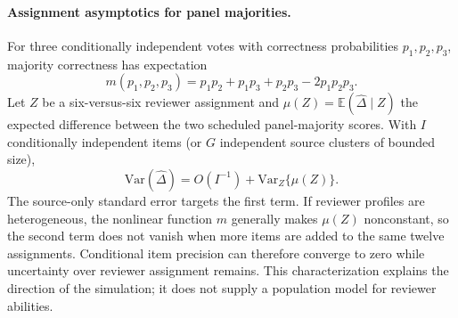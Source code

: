 \paragraph{Assignment asymptotics for panel majorities.}
For three conditionally independent votes with correctness probabilities
\(p_1,p_2,p_3\), majority correctness has expectation
\[
m(p_1,p_2,p_3)
=p_1p_2+p_1p_3+p_2p_3-2p_1p_2p_3.
\]
Let \(Z\) be a six-versus-six reviewer assignment and
\(\mu(Z)=\mathbb E(\widehat\Delta\mid Z)\) the expected difference between
the two scheduled panel-majority scores. With \(I\) conditionally independent
items (or \(G\) independent source clusters of bounded size),
\[
\mathrm{Var}(\widehat\Delta)
=O(I^{-1})+\mathrm{Var}_{Z}\{\mu(Z)\}.
\]
The source-only standard error targets the first term. If reviewer profiles
are heterogeneous, the nonlinear function \(m\) generally makes
\(\mu(Z)\) nonconstant, so the second term does not vanish when more items are
added to the same twelve assignments. Conditional item precision can
therefore converge to zero while uncertainty over reviewer assignment remains.
This characterization explains the direction of the simulation; it does not
supply a population model for reviewer abilities.
